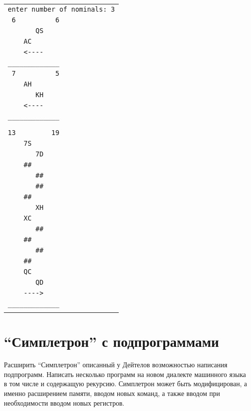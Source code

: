 \documentclass[12pt, oneside]{article}
\begin{document}
\begin{tabular}{| p{} |}
\hline
\verb'enter number of nominals: 3'\\
\verb' 6          6'\\
\verb'       QS    '\\
\verb'    AC       '\\
\verb'    <----    '\\
\verb'_____________'\\
\verb' 7          5'\\
\verb'    AH       '\\
\verb'       KH    '\\
\verb'    <----    '\\
\verb'_____________'\\
\\
\hline
\\
\verb'13         19'\\
\verb'    7S       '\\
\verb'       7D    '\\
\verb'    ##       '\\
\verb'       ##    '\\
\verb'       ##    '\\
\verb'    ##       '\\
\verb'       XH    '\\
\verb'    XC       '\\
\verb'       ##    '\\
\verb'    ##       '\\
\verb'       ##    '\\
\verb'    ##       '\\
\verb'    QC       '\\
\verb'       QD    '\\
\verb'    ---->    '\\
\verb'_____________'\\
\\
\hline
\end{tabular}

\section{``Симплетрон'' с подпрограммами}

Расширить ``Симплетрон'' описанный у Дейтелов возможностью написания подпрограмм. Написать несколько программ на новом диалекте машинного языка в том числе и содержащую рекурсию. Симплетрон может быть модифицирован, а именно расширением памяти, вводом новых команд, а также вводом при необходимости вводом новых регистров.
\end{document}
